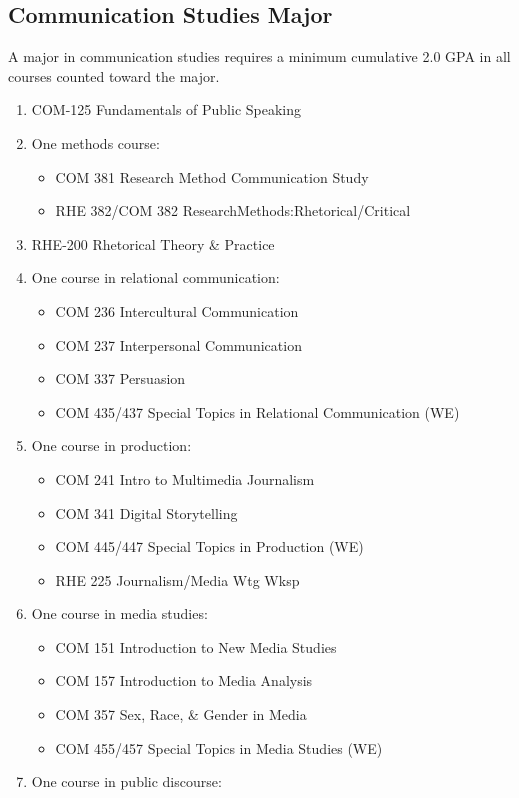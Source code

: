 \documentclass[
  letterpaper,
]{scrbook}
\providecommand{\tightlist}{%
  \setlength{\itemsep}{0pt}\setlength{\parskip}{0pt}}
\begin{document}
\subsection{Communication Studies
Major}\label{communication-studies-major}

A major in communication studies requires a minimum cumulative 2.0 GPA
in all courses counted toward the major.

\begin{enumerate}
\def\labelenumi{\arabic{enumi}.}
\tightlist
\item
  COM-125 Fundamentals of Public Speaking
\item
  One methods course:

  \begin{itemize}
  \tightlist
  \item
    COM 381 Research Method Communication Study
  \item
    RHE 382/COM 382 ResearchMethods:Rhetorical/Critical
  \end{itemize}
\item
  RHE-200 Rhetorical Theory \& Practice
\item
  One course in relational communication:

  \begin{itemize}
  \tightlist
  \item
    COM 236 Intercultural Communication
  \item
    COM 237 Interpersonal Communication
  \item
    COM 337 Persuasion
  \item
    COM 435/437 Special Topics in Relational Communication (WE)
  \end{itemize}
\item
  One course in production:

  \begin{itemize}
  \tightlist
  \item
    COM 241 Intro to Multimedia Journalism
  \item
    COM 341 Digital Storytelling
  \item
    COM 445/447 Special Topics in Production (WE)
  \item
    RHE 225 Journalism/Media Wtg Wksp
  \end{itemize}
\item
  One course in media studies:

  \begin{itemize}
  \tightlist
  \item
    COM 151 Introduction to New Media Studies
  \item
    COM 157 Introduction to Media Analysis
  \item
    COM 357 Sex, Race, \& Gender in Media
  \item
    COM 455/457 Special Topics in Media Studies (WE)
  \end{itemize}
\item
  One course in public discourse:


\end{enumerate}
\end{document}
